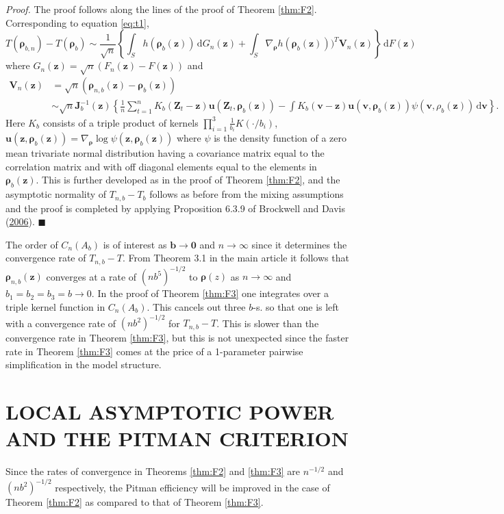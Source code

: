 \documentclass[
  12pt,
  letterpaper]{article}
\numberwithin{equation}{section}
\newcommand{\Z}{\bm{Z}}
\newcommand{\z}{\bm{z}}
\newcommand{\fv}{\bm{v}}
\newcommand{\fu}{\bm{u}}
\newcommand{\fV}{\bm{V}}
\newcommand{\J}{\bm{J}}
\newcommand{\frho}{\bm{\rho}}
\newcommand{\bb}{\bm{b}}
\newcommand{\di}{\,\textrm{d}}
\begin{document}
\emph{Proof.} The proof follows along the lines of the proof of Theorem \ref{thm:F2}. Corresponding to equation \eqref{eq:t1},
\[
T(\frho_{b,n}) - T(\frho_{b}) \sim \frac{1}{\sqrt{n}}\left\{\int_S h(\frho_b(\z)) \di G_n(\z) + \int_S \nabla_{\frho} h(\frho_b(\z)))^T \fV_n(\z)\right\} \di F(\z)
\]
where \(G_n(\z) = \sqrt{n}(F_n(\z)-F(\z))\) and
\begin{align*}
\fV_n(\z) &= \sqrt{n} (\frho_{n,b}(\z) - \frho_b(\z)) \\
& \sim \sqrt{n}{\J}_b^{-1}(\z)\left\{\frac{1}{n} \sum_{t=1}^{n}K_b(\Z_t-\z)\fu(\Z_t,\frho_b(\z)) - \int K_b(\fv-\z)\fu(\fv,\frho_b(\z))\psi(\fv,\rho_b(\z)) \di \fv \right\}.
\end{align*}
Here \(K_b\) consists of a triple product of kernels \(\prod_{i=1}^{3}\frac{1}{b_i}K(\cdot/b_i)\), \(\fu(\z,\frho_b(\z)) = \nabla_{\frho}\log \psi(\z,\frho_b(\z))\) where \(\psi\) is the density function of a zero mean trivariate normal distribution having a covariance matrix equal to the correlation matrix and with off diagonal elements equal to the elements in \(\frho_b(\z)\). This is further developed as in the proof of Theorem \ref{thm:F2}, and the asymptotic normality of \(T_{n,b}-T_b\) follows as before from the mixing assumptions and the proof is completed by applying Proposition 6.3.9 of Brockwell and Davis (\protect\hyperlink{ref-brockwell1991time}{2006}). \(\blacksquare\)

The order of \(C_n(A_b)\) is of interest as \(\bb\to \bm{0}\) and \(n \to \infty\) since it determines the convergence rate of \(T_{n,b}-T\). From Theorem 3.1 in the main article it follows that \(\frho_{n,b}(\z)\) converges at a rate of \((nb^5)^{-1/2}\) to \(\frho(z)\) as \(n \to \infty\) and \(b_1=b_2=b_3 = b \to 0\). In the proof of Theorem \ref{thm:F3} one integrates over a triple kernel function in \(C_n(A_b)\). This cancels out three \(b\)-s. so that one is left with a convergence rate of \((nb^2)^{-1/2}\) for \(T_{n,b}-T\). This is slower than the convergence rate in Theorem \ref{thm:F3}, but this is not unexpected since the faster rate in Theorem \ref{thm:F3} comes at the price of a 1-parameter pairwise simplification in the model structure.

\hypertarget{chap:pitman}{%
\section{LOCAL ASYMPTOTIC POWER AND THE PITMAN CRITERION}\label{chap:pitman}}

Since the rates of convergence in Theorems \ref{thm:F2} and \ref{thm:F3} are \(n^{-1/2}\) and \((nb^2)^{-1/2}\) respectively, the Pitman efficiency will be improved in the case of Theorem \ref{thm:F2} as compared to that of Theorem \ref{thm:F3}.
\end{document}
